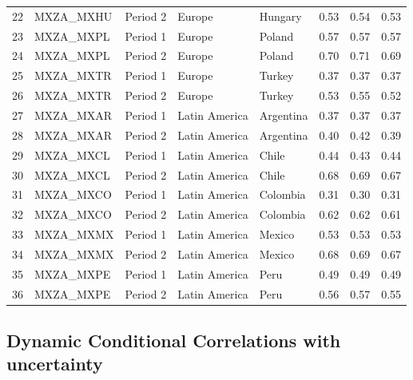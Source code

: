 \documentclass[11pt,preprint, authoryear]{elsarticle}
\numberwithin{equation}{section}
\numberwithin{figure}{section}
\numberwithin{table}{section}
\begin{document}
\begin{longtable}{rllllrrr}
  22 & MXZA\_MXHU & Period 2 & Europe & Hungary & 0.53 & 0.54 & 0.53 \\ 
  23 & MXZA\_MXPL & Period 1 & Europe & Poland & 0.57 & 0.57 & 0.57 \\ 
  24 & MXZA\_MXPL & Period 2 & Europe & Poland & 0.70 & 0.71 & 0.69 \\ 
  25 & MXZA\_MXTR & Period 1 & Europe & Turkey & 0.37 & 0.37 & 0.37 \\ 
  26 & MXZA\_MXTR & Period 2 & Europe & Turkey & 0.53 & 0.55 & 0.52 \\ 
  27 & MXZA\_MXAR & Period 1 & Latin America & Argentina & 0.37 & 0.37 & 0.37 \\ 
  28 & MXZA\_MXAR & Period 2 & Latin America & Argentina & 0.40 & 0.42 & 0.39 \\ 
  29 & MXZA\_MXCL & Period 1 & Latin America & Chile & 0.44 & 0.43 & 0.44 \\ 
  30 & MXZA\_MXCL & Period 2 & Latin America & Chile & 0.68 & 0.69 & 0.67 \\ 
  31 & MXZA\_MXCO & Period 1 & Latin America & Colombia & 0.31 & 0.30 & 0.31 \\ 
  32 & MXZA\_MXCO & Period 2 & Latin America & Colombia & 0.62 & 0.62 & 0.61 \\ 
  33 & MXZA\_MXMX & Period 1 & Latin America & Mexico & 0.53 & 0.53 & 0.53 \\ 
  34 & MXZA\_MXMX & Period 2 & Latin America & Mexico & 0.68 & 0.69 & 0.67 \\ 
  35 & MXZA\_MXPE & Period 1 & Latin America & Peru & 0.49 & 0.49 & 0.49 \\ 
  36 & MXZA\_MXPE & Period 2 & Latin America & Peru & 0.56 & 0.57 & 0.55 \\ 
   \hline
\hline
\end{longtable}

\hypertarget{dynamic-conditional-correlations-with-uncertainty}{%
\subsection{Dynamic Conditional Correlations with
uncertainty}\label{dynamic-conditional-correlations-with-uncertainty}}
\end{document}
